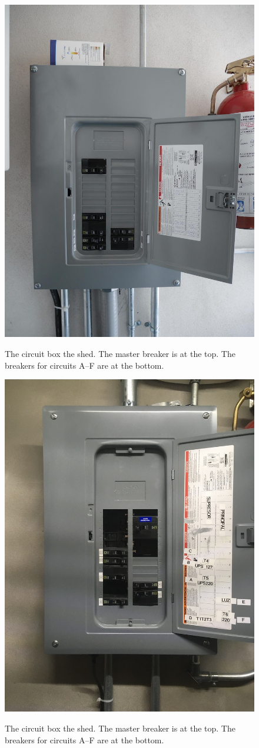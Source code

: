 \begin{figure}[t]
\ifcoatlioan
\begin{center}
\begin{labeled}{\includegraphics[height=0.7\linewidth]{figures/electrical-power-coatli-circuit-box.jpg}}
\end{labeled}
\end{center}
\caption{The circuit box the {\projectname} shed. The master breaker is at the top. The breakers for circuits A--F are at the bottom.}
\fi
\ifddotioan
\begin{center}
\begin{labeled}{\includegraphics[width=0.45\linewidth,angle=0]{figures/electrical-power-ddoti-circuit-box.jpg}}
\end{labeled}
\end{center}
\caption{The circuit box the {\projectname} shed. The master breaker is at the top. The breakers for circuits A--F are at the bottom.}
\fi
\label{figure:circuit-box}
\end{figure}


